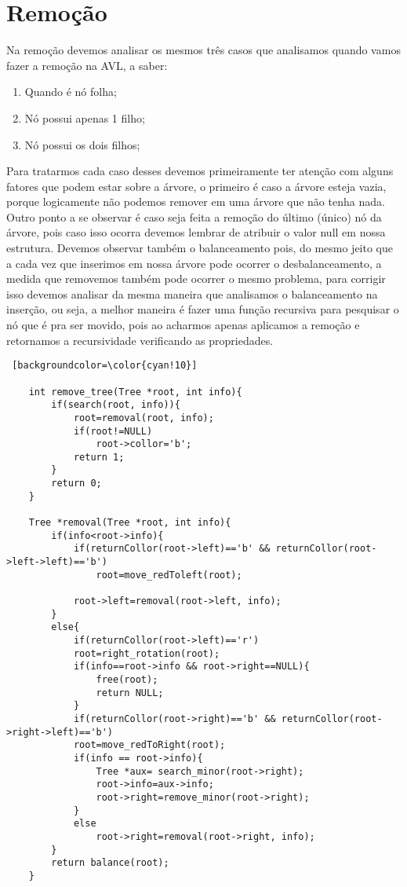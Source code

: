 \documentclass[report]{uftex}
\begin{document}
\section{Remoção}
\label{cap:remocao}
    
    \noindent Na remoção devemos analisar os mesmos três casos que analisamos quando vamos fazer a remoção na AVL, a saber:
        \begin{enumerate}
            \item Quando é nó folha;
            \item Nó possui apenas 1 filho;
            \item Nó possui os dois filhos;
        \end{enumerate}
        
    Para tratarmos cada caso desses devemos primeiramente ter atenção com alguns fatores que podem estar sobre a árvore, o primeiro é caso a árvore esteja vazia, porque logicamente não podemos remover em uma árvore que não tenha nada. Outro ponto a se observar é caso seja feita a remoção do último (único) nó da árvore, pois caso isso ocorra devemos lembrar de atribuir o valor null em nossa estrutura. Devemos observar também o balanceamento pois, do mesmo jeito que a cada vez que inserimos em nossa árvore pode ocorrer o desbalanceamento, a medida que removemos também pode ocorrer o mesmo problema, para corrigir isso devemos analisar da mesma maneira que analisamos o balanceamento na inserção, ou seja, a melhor maneira é fazer uma função recursiva para pesquisar o nó que é pra ser movido, pois ao acharmos apenas aplicamos a remoção e retornamos a recursividade verificando as propriedades.\\
    
    \begin{lstlisting} [backgroundcolor=\color{cyan!10}]
    
    int remove_tree(Tree *root, int info){
        if(search(root, info)){
            root=removal(root, info);
            if(root!=NULL)
                root->collor='b';
            return 1;
        }
        return 0;
    }

    Tree *removal(Tree *root, int info){
        if(info<root->info){
            if(returnCollor(root->left)=='b' && returnCollor(root->left->left)=='b')
                root=move_redToleft(root);

            root->left=removal(root->left, info);
        }
        else{
            if(returnCollor(root->left)=='r')
            root=right_rotation(root);
            if(info==root->info && root->right==NULL){
                free(root);
                return NULL;
            }
            if(returnCollor(root->right)=='b' && returnCollor(root->right->left)=='b')
            root=move_redToRight(root);
            if(info == root->info){
                Tree *aux= search_minor(root->right);
                root->info=aux->info;
                root->right=remove_minor(root->right);
            }
            else
                root->right=removal(root->right, info);
        }
        return balance(root);
    }

    \end{lstlisting}
    
\end{document}
